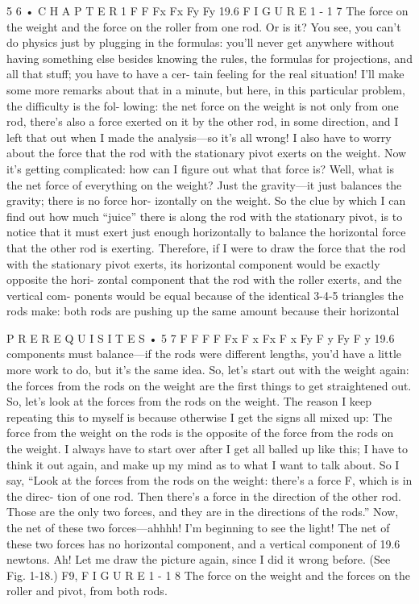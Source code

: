 \documentclass[10pt,oneside]{article}
\begin{document}
5 6 • C H A P T E R  1 F F Fx Fx Fy Fy   19.6 F I G U R E 1 - 1 7 The force on the weight and the force on the roller from one rod. Or is it? You see, you can’t do physics just by plugging in the formulas: you’ll never get anywhere without having something else besides knowing the rules, the formulas for projections, and all that stuff; you have to have a cer- tain feeling for the real situation! I’ll make some more remarks about that in a minute, but here, in this particular problem, the difficulty is the fol- lowing: the net force on the weight is not only from one rod, there’s also a force exerted on it by the other rod, in some direction, and I left that out when I made the analysis---so it’s all wrong! I also have to worry about the force that the rod with the stationary pivot exerts on the weight. Now it’s getting complicated: how can I figure out what that force is? Well, what is the net force of everything on the weight? Just the gravity---it just balances the gravity; there is no force hor- izontally on the weight. So the clue by which I can find out how much “juice” there is along the rod with the stationary pivot, is to notice that it must exert just enough horizontally to balance the horizontal force that the other rod is exerting. Therefore, if I were to draw the force that the rod with the stationary pivot exerts, its horizontal component would be exactly opposite the hori- zontal component that the rod with the roller exerts, and the vertical com- ponents would be equal because of the identical 3-4-5 triangles the rods make: both rods are pushing up the same amount because their horizontal\par

P R E R E Q U I S I T E S • 5 7 F F F F Fx F x Fx F x Fy F y Fy   F y   19.6 components must balance---if the rods were different lengths, you’d have a little more work to do, but it’s the same idea. So, let’s start out with the weight again: the forces from the rods on the weight are the first things to get straightened out. So, let’s look at the forces from the rods on the weight. The reason I keep repeating this to myself is because otherwise I get the signs all mixed up: The force from the weight on the rods is the opposite of the force from the rods on the weight. I always have to start over after I get all balled up like this; I have to think it out again, and make up my mind as to what I want to talk about. So I say, “Look at the forces from the rods on the weight: there’s a force F, which is in the direc- tion of one rod. Then there’s a force in the direction of the other rod. Those are the only two forces, and they are in the directions of the rods.” Now, the net of these two forces---ahhhh! I’m beginning to see the light! The net of these two forces has no horizontal component, and a vertical component of 19.6 newtons. Ah! Let me draw the picture again, since I did it wrong before. (See Fig. 1-18.) F9, F I G U R E 1 - 1 8 The force on the weight and the forces on the roller and pivot, from both rods.\par
\end{document}
